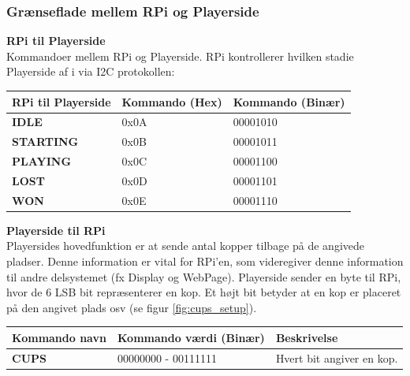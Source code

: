 \documentclass[Arkitektur/System_main.tex]{subfiles}
\begin{document}
\subsubsection{Grænseflade mellem RPi og Playerside}

\textbf{RPi til Playerside}
\\Kommandoer mellem RPi og Playerside. RPi kontrollerer hvilken stadie Playerside af i via I2C protokollen: 
\begin{table}[H]
\centering
\begin{tabular}{|L{0.3\textwidth}|L{0.3\textwidth}|L{0.3\textwidth}|}
\hline
\textbf{RPi til Playerside} & \textbf{Kommando (Hex)} & \textbf{Kommando (Binær)} \\ \hline
\textbf{IDLE} & 0x0A & 00001010 \\ \hline
\textbf{STARTING} & 0x0B & 00001011 \\ \hline
\textbf{PLAYING} & 0x0C & 00001100 \\ \hline
\textbf{LOST} & 0x0D & 00001101 \\ \hline
\textbf{WON} & 0x0E & 00001110 \\ \hline
\end{tabular}

\end{table}

\textbf{Playerside til RPi}
\\Playersides hovedfunktion er at sende antal kopper tilbage på de angivede pladser. Denne information er vital for RPi'en, som videregiver denne information til andre delsystemet (fx Display og WebPage). 
Playerside sender en byte til RPi, hvor de 6 LSB bit repræsenterer en kop. Et højt bit betyder at en kop er placeret på den angivet plads osv (se figur \ref{fig:cups_setup}). 
\begin{table}[H]
\centering
\begin{tabular}{|L{0.3\textwidth}|L{0.3\textwidth}|L{0.3\textwidth}|}
\hline
\textbf{Kommando navn} & \textbf{Kommando værdi (Binær)} & \textbf{Beskrivelse} \\ \hline
\textbf{CUPS} & 00000000 - 00111111 & Hvert bit angiver en kop. \\ \hline
\end{tabular}
\end{table}
\end{document}
